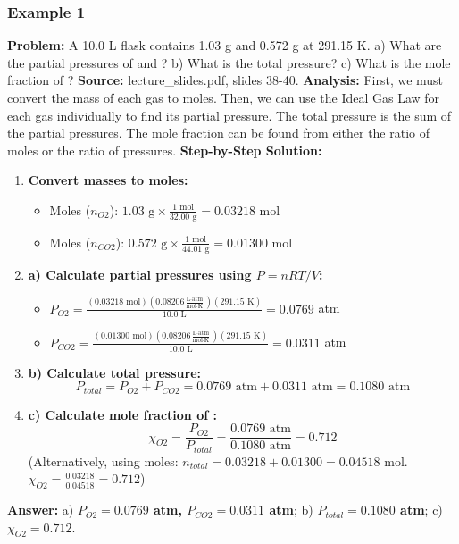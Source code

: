 \documentclass{article}
\begin{document}
\subsubsection{Example 1}
\textbf{Problem:} A 10.0 L flask contains 1.03 g  and 0.572 g  at 291.15 K.
a) What are the partial pressures of  and ?
b) What is the total pressure?
c) What is the mole fraction of ?
\textbf{Source:} lecture\_slides.pdf, slides 38-40.
\textbf{Analysis:} First, we must convert the mass of each gas to moles. Then, we can use the Ideal Gas Law for each gas individually to find its partial pressure. The total pressure is the sum of the partial pressures. The mole fraction can be found from either the ratio of moles or the ratio of pressures.
\textbf{Step-by-Step Solution:}
\begin{enumerate}
    \item \textbf{Convert masses to moles:}
    \begin{itemize}
        \item Moles  ($n_{O2}$): $1.03 \text{ g} \times \frac{1 \text{ mol}}{32.00 \text{ g}} = 0.03218$ mol
        \item Moles  ($n_{CO2}$): $0.572 \text{ g} \times \frac{1 \text{ mol}}{44.01 \text{ g}} = 0.01300$ mol
    \end{itemize}
    \item \textbf{a) Calculate partial pressures using $P = nRT/V$:}
    \begin{itemize}
        \item $P_{O2} = \frac{(0.03218 \text{ mol})(0.08206 \frac{\text{L}\cdot\text{atm}}{\text{mol}\cdot\text{K}})(291.15 \text{ K})}{10.0 \text{ L}} = 0.0769$ atm
        \item $P_{CO2} = \frac{(0.01300 \text{ mol})(0.08206 \frac{\text{L}\cdot\text{atm}}{\text{mol}\cdot\text{K}})(291.15 \text{ K})}{10.0 \text{ L}} = 0.0311$ atm
    \end{itemize}
    \item \textbf{b) Calculate total pressure:}
    \[ P_{total} = P_{O2} + P_{CO2} = 0.0769 \text{ atm} + 0.0311 \text{ atm} = 0.1080 \text{ atm} \]
    \item \textbf{c) Calculate mole fraction of :}
    \[ \chi_{O2} = \frac{P_{O2}}{P_{total}} = \frac{0.0769 \text{ atm}}{0.1080 \text{ atm}} = 0.712 \]
    (Alternatively, using moles: $n_{total} = 0.03218 + 0.01300 = 0.04518$ mol. $\chi_{O2} = \frac{0.03218}{0.04518} = 0.712$)
\end{enumerate}
\textbf{Answer:} a) \textbf{$P_{O2}=0.0769$ atm, $P_{CO2}=0.0311$ atm}; b) \textbf{$P_{total}=0.1080$ atm}; c) \textbf{$\chi_{O2}=0.712$}.
\end{document}
